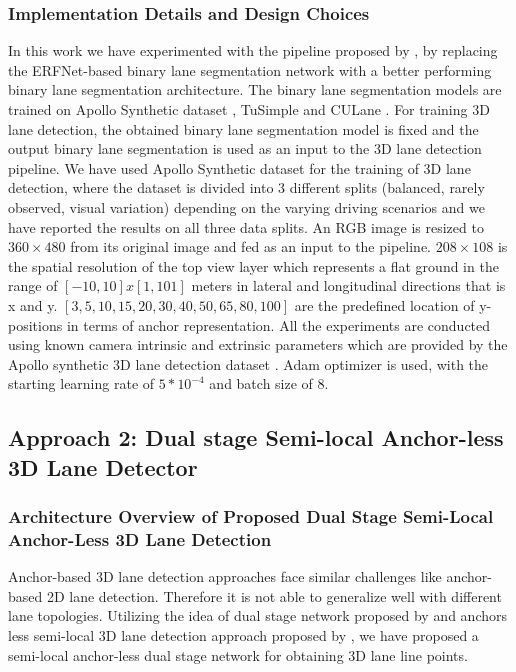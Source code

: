            \subsubsection{Implementation Details and Design Choices}
            In this work we have experimented with the pipeline proposed by \cite{Guo_2018_ECCV}, by replacing the ERFNet-based \cite{Romera2018ERFNetER}  binary lane segmentation network with a better performing binary lane segmentation architecture. The binary lane segmentation models are trained on Apollo Synthetic dataset \cite{guo2020gen}, TuSimple \cite{Tusimple} and CULane \cite{pan2018SCNN}. For training 3D lane detection, the obtained binary lane segmentation model is fixed and the output binary lane segmentation is used as an input to the 3D lane detection pipeline. We have used Apollo Synthetic dataset \cite{Guo_2018_ECCV} for the training of 3D lane detection, where the dataset is divided into 3 different splits (balanced, rarely observed, visual variation) depending on the varying driving scenarios and we have reported the results on all three data splits. An RGB image is resized to $360 \times 480$ from its original image and fed as an input to the pipeline. $208 \times 108$ is the spatial resolution of the top view layer which represents a flat ground in the range of $[-10, 10] x [1 , 101]$ meters in lateral and longitudinal directions that is x and y. $[3, 5, 10, 15, 20, 30, 40, 50, 65, 80, 100]$ are the predefined location of y-positions in terms of anchor representation. All the experiments are conducted using known camera intrinsic and extrinsic parameters which are provided by the Apollo synthetic 3D lane detection dataset \cite{guo2020gen}. Adam optimizer is used, with the starting learning rate of $5*10^{-4}$ and batch size of 8. 
            
        \subsection{Approach 2: Dual stage Semi-local Anchor-less 3D Lane Detector}
        
        \subsubsection{Architecture Overview of Proposed Dual Stage Semi-Local Anchor-Less 3D Lane Detection}
        
        Anchor-based 3D lane detection approaches face similar challenges like anchor-based 2D lane detection. Therefore it is not able to generalize well with different lane topologies. Utilizing the idea of dual stage network proposed by \cite{guo2020gen} and anchors less semi-local 3D lane detection approach proposed by \cite{DBLP:journals/corr/abs-2011-01535}, we have proposed a semi-local anchor-less dual stage network for obtaining 3D lane line points.
        
